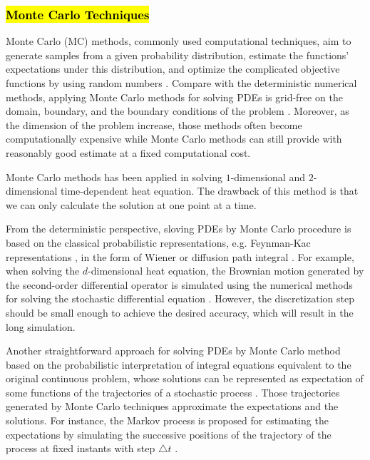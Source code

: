 

\subsubsection{\textcolor{red}{\textbf{\hl{Monte Carlo Techniques}}}}


Monte Carlo (MC) methods, commonly used computational techniques, aim
to generate samples from a given probability distribution, estimate
the functions' expectations under this distribution, and optimize the
complicated objective functions by using random numbers
\cite{kroese2014monte}. Compare with the deterministic numerical
methods, applying Monte Carlo methods for solving PDEs is grid-free on
the domain, boundary, and the boundary conditions of the problem
\cite{grebenkov2014efficient}. Moreover, as the dimension of the
problem increase, those methods often become computationally expensive
while Monte Carlo methods can still provide with reasonably good
estimate at a fixed computational cost. 

Monte Carlo methods has been applied in solving $1$-dimensional and
$2$-dimensional time-dependent heat equation. The drawback of this
method is that we can only calculate the solution at one point at a
time. 

From the deterministic perspective, sloving PDEs by Monte Carlo
procedure is based on the classical probabilistic representations,
e.g. Feynman-Kac representations \cite{kac1987enigmas}, in the form of
Wiener or diffusion path integral \cite{sabelfeld2013random}. For
example, when solving the $d$-dimensional heat equation, the Brownian
motion generated by the second-order differential operator is
simulated using the numerical methods for solving the stochastic
differential equation \cite{wiki:MCMheat}. However, the discretization
step should be small enough to achieve the desired accuracy, which
will result in the long simulation.

Another straightforward approach for solving PDEs by Monte Carlo
method based on the probabilistic interpretation of integral equations
equivalent to the original continuous problem, whose solutions can be
represented as expectation of some functions of the trajectories of a
stochastic process
\cite{varadhan1980lectures}\cite{grebenkov2014efficient}\cite{sabelfeld2013random}.
Those trajectories generated by Monte Carlo techniques approximate the
expectations and the solutions. For instance, the Markov process is
proposed for estimating the expectations by simulating the successive
positions of the trajectory of the process at fixed instants with step
$\triangle t$ \cite{kronberg1976solution}\cite{king1951monte}.

